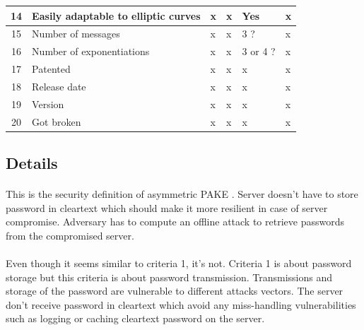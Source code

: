 \documentclass[../report.tex]{subfiles}
\begin{document}
\begin{center}
\begin{tabular}{ | c | p{8cm} || p{1cm} | p{1cm} | p{2cm} | p{2cm} | }
     
     14 & Easily adaptable to elliptic curves & x & x & Yes & x \\ \hline
     15 & Number of messages & x & x & 3 ? & x \\ \hline
     16 & Number of exponentiations & x & x & 3 or 4 ? & x \\ \hline
     17 & Patented & x & x & x & x \\ \hline
     18 & Release date & x & x & x & x \\ \hline
     19 & Version & x & x & x & x \\ \hline
     20 & Got broken & x & x & x & x \\ \hline

     \end{tabular}
 \end{center}
 
\subsection{Details} \label{sec:comparison_details}



\paragraph{}
This is the security definition of asymmetric PAKE \cite{aPAKE_Formalized}. Server doesn't have to store password in cleartext which should make it more resilient in case of server compromise. Adversary has to compute an offline attack to retrieve passwords from the compromised server.

\paragraph{}
Even though it seems similar to criteria 1, it's not. Criteria 1 is about password storage but this criteria is about password transmission. Transmissions and storage of the password are vulnerable to different attacks vectors.
The server don't receive password in cleartext which avoid any miss-handling vulnerabilities such as logging or caching cleartext password on the server.
\end{document}
